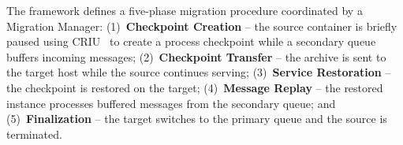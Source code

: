 \documentclass[conference]{IEEEtran}
\begin{document}
%
%
%
%
%
The framework defines a five-phase migration procedure coordinated by a
Migration Manager: (1)~\textbf{Checkpoint Creation} -- the source container is
briefly paused using CRIU~\cite{criu} to create a process checkpoint while a
secondary queue buffers incoming messages; (2)~\textbf{Checkpoint Transfer} --
the archive is sent to the target host while the source continues serving;
(3)~\textbf{Service Restoration} -- the checkpoint is restored on the target;
(4)~\textbf{Message Replay} -- the restored instance processes buffered messages
from the secondary queue; and (5)~\textbf{Finalization} -- the target switches
to the primary queue and the source is terminated.
\end{document}

